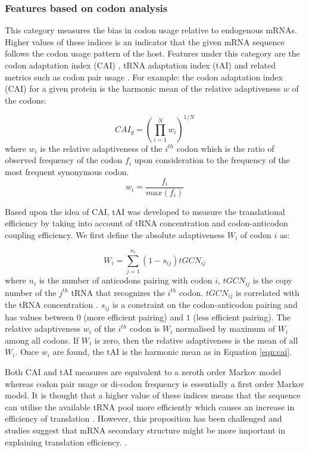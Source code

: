 

\subsubsection{Features based on codon analysis}
This category measures the bias in codon usage relative  to endogenous mRNAs. Higher values of these indices is an indicator that the given mRNA sequence follows the codon usage pattern of the host. Features under this category are the codon adaptation index (CAI) \cite{Sharp1987-ed}, tRNA adaptation index (tAI) \cite{ Reis2004-dl, Sabi2014-je} and related metrics such as codon pair usage \cite{Gutman1989-pn}. For example: the codon adaptation index (CAI) for a given protein is the harmonic mean of the relative adaptiveness $w$ \cite{Sharp1987-ed} of the codons:

\begin{equation}
    CAI_{g}=(\prod_{i=1}^{N} w_i)^{1/N}
    \label{eqn:cai}
\end{equation}
where $w_i$ is the relative adaptiveness of the $i^{th}$ codon which is the ratio of observed frequency of the codon $f_i$ upon consideration to the frequency of the most frequent synonymous codon. $$w_i = \frac{f_i}{max(f_i)}$$ 

Based upon the idea of CAI, tAI was developed to measure the translational efficiency by taking into account of tRNA concentration and codon-anticodon coupling efficiency. We first define the absolute adaptiveness $W_i$ of codon $i$ as:

\begin{equation}
    W_i = \sum_{j=1}^{n_i} (1 - s_{ij})tGCN_{ij}
\end{equation}
where $n_i$ is the number of anticodons pairing with codon $i$, $tGCN_{ij}$ is the copy number of the $j^{th}$ tRNA that recognizes the $i^{th}$ codon. $tGCN_{ij}$ is correlated with the tRNA concentration \cite{kanaya1999studies, novoa2012role}. $s_{ij}$ is a constraint on the codon-anticodon pairing and has values between $0$ (more efficient pairing) and $1$ (less efficient pairing). The relative adaptiveness $w_i$ of the $i^{th}$ codon is  $W_i$ normalised by maximum of $W_i$ among all codons. If $W_i$ is zero, then the relative adaptiveness is the mean of all $W_i$. Once $w_i$ are found, the tAI is the harmonic mean as in Equation \ref{eqn:cai}. 


Both CAI and tAI measures are equivalent to a zeroth order Markov model whereas codon pair usage or di-codon frequency is essentially a first order Markov model. It is thought that a higher value of these indices means that the sequence can utilise the available tRNA pool more efficiently which causes an increase in efficiency of translation \cite{ikemura1985codon, Gutman1989-pn, Sharp1987-ed, Reis2004-dl, Sabi2014-je, Brule2017-mx}. However, this proposition has been challenged and studies suggest that mRNA secondary structure might be more important in explaining translation efficiency.  \cite{Kudla2009-tl, Boel2016-jd, Cambray2018-kn}.